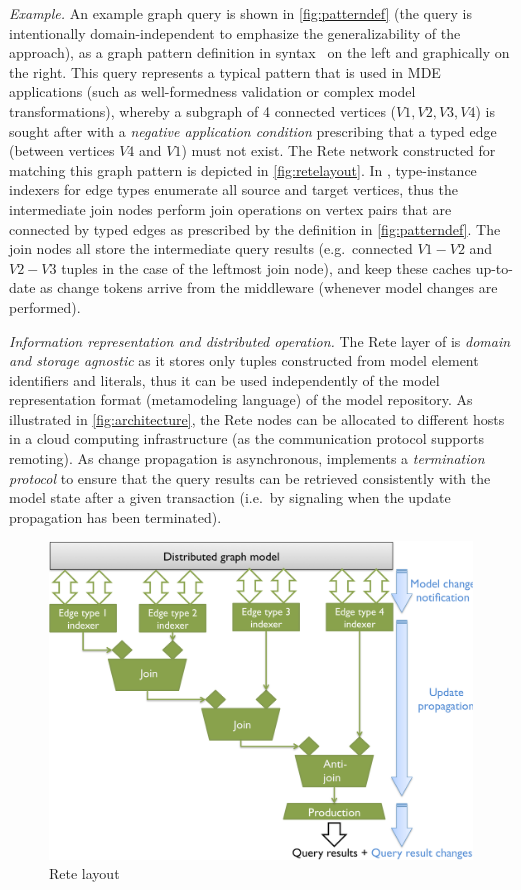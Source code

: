 \emph{Example.}
An example graph query is shown in \autoref{fig:patterndef} (the query is intentionally domain-independent to emphasize the generalizability of the approach), as a graph pattern definition in \eiq{} syntax~\cite{models10} on the left and graphically on the right. This query represents a typical pattern that is used in MDE applications (such as well-formedness validation or complex model transformations), whereby a subgraph of 4 connected vertices ($V1, V2, V3, V4$) is sought after with a \emph{negative application condition} prescribing that a typed edge (between vertices $V4$ and $V1$) must not exist.
The Rete network constructed for matching this graph pattern is depicted in \autoref{fig:retelayout}. In \iqd{}, type-instance indexers for edge types enumerate all source and target vertices, thus the intermediate join nodes perform join operations on vertex pairs that are connected by typed edges as prescribed by the definition in \autoref{fig:patterndef}. The join nodes all store the intermediate query results (e.g.\ connected $V1-V2$ and $V2-V3$ tuples in the case of the leftmost join node), and keep these caches up-to-date as change tokens arrive from the middleware (whenever model changes are performed).

\emph{Information representation and distributed operation.} The Rete layer of \iqd{} is \emph{domain and storage agnostic} as it stores only tuples constructed from model element identifiers and literals, thus it can be used independently of the model representation format (metamodeling language) of the model repository.
As illustrated in \autoref{fig:architecture}, the Rete nodes can be allocated to different hosts in a cloud computing infrastructure (as the communication protocol supports remoting). As change propagation is asynchronous, \iqd{} implements a \emph{termination protocol} to ensure that the query results can be retrieved consistently with the model state after a given transaction (i.e.\ by signaling when the update propagation has been terminated).

\begin{figure}[!tb]
\begin{center}
\includegraphics[width=.8\columnwidth]{figures/reteinternals}
\caption{Rete layout}
\label{fig:retelayout}
\end{center}
\end{figure}

